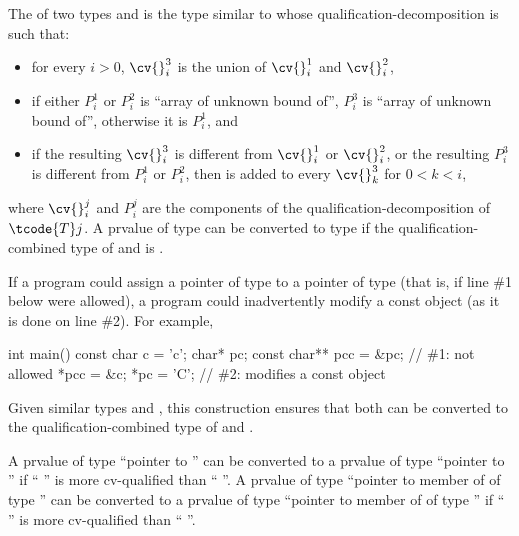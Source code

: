\pnum
The  of two types  and 
is the type 
similar to  whose qualification-decomposition is such that:
\begin{itemize}
\item
for every $i > 0$, $\cv{}^3_i$ is the union of
$\cv{}^1_i$ and $\cv{}^2_i$,
\item
if either $P^1_i$ or $P^2_i$ is ``array of unknown bound of'',
$P^3_i$ is ``array of unknown bound of'', otherwise it is $P^1_i$, and
\item
if the resulting $\cv{}^3_i$ is different from $\cv{}^1_i$ or $\cv{}^2_i$,
or the resulting $P^3_i$ is different from $P^1_i$ or $P^2_i$,
then  is added to every $\cv{}^3_k$ for $0 < k < i$,
\end{itemize}
where $\cv{}^j_i$ and $P^j_i$ are the components of
the qualification-decomposition of $\tcode{T}j$.
A prvalue of type 
can be converted to type 
if the qualification-combined type of  and  is .
\begin{note}
If a program could assign a pointer of type  to a pointer of
type   (that is, if line \#1 below were
allowed), a program could inadvertently modify a const object
(as it is done on line \#2). For example,
\begin{codeblock}
int main() {
  const char c = 'c';
  char* pc;
  const char** pcc = &pc;       // \#1: not allowed
  *pcc = &c;
  *pc = 'C';                    // \#2: modifies a const object
}
\end{codeblock}
\end{note}
\begin{note}
Given similar types  and , this
construction ensures that
both can be converted to the qualification-combined type of  and .
\end{note}

\pnum
\begin{note}
A prvalue of type ``pointer to  '' can be
converted to a prvalue of type ``pointer to  '' if
`` '' is more cv-qualified than ``
''.
A prvalue of type ``pointer to member of  of type 
'' can be converted to a prvalue of type ``pointer to member
of  of type  '' if ``
'' is more cv-qualified than `` ''.
\end{note}

